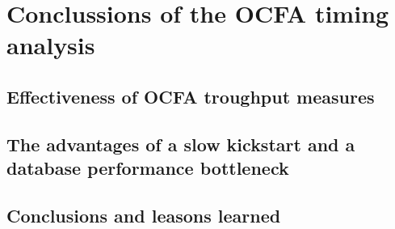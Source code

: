 \section{Conclussions of the OCFA timing analysis}
\subsection{Effectiveness of OCFA troughput measures}

\subsection{The advantages of a slow kickstart and a database performance bottleneck}

\subsection{Conclusions and leasons learned}
